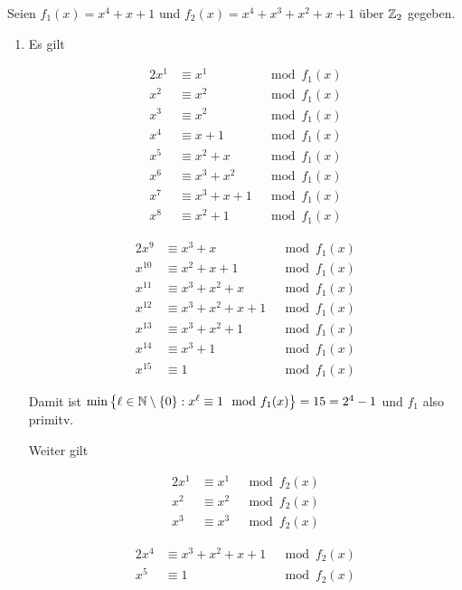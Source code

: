\documentclass[ngerman, a4paper, 11pt]{article}
\newcounter{blattcount}
\theoremstyle{plain}
\theoremstyle{plain}
\theoremstyle{proofstyle}
\begin{document}
	
	\setcounter{blattcount}{5}

\begin{exercisePage}
	Seien $f_1(x) = x^4+x+1$ und $f_2(x) = x^4+x^3+x^2+x+1$ über $\mathbb{Z}_2$ gegeben.
	
	\begin{enumerate}[label=(zu \alph*), leftmargin=*]
		\item Es gilt \\		
		\begin{minipage}{\dimexpr0.5\linewidth-\fboxrule-\fboxsep}
			\begin{alignat*}{2}
				x^1 &\equiv x^1 &\mod f_1(x)\\
				x^2 &\equiv x^2 &\mod f_1(x)\\
				x^3 &\equiv x^2 &\mod f_1(x)\\
				x^4 &\equiv x + 1 &\mod f_1(x)\\
				x^5 &\equiv x^2 + x &\mod f_1(x)\\
				x^6 &\equiv x^3 + x^2 &\mod f_1(x)\\
				x^7 &\equiv x^3 + x + 1 &\mod f_1(x)\\
				x^8 &\equiv x^2 + 1 &\mod f_1(x)
			\end{alignat*}
		\end{minipage}
		\begin{minipage}{\dimexpr0.5\linewidth-\fboxrule-\fboxsep}
			\begin{alignat*}{2}
				x^9 &\equiv x^3 + x &\mod f_1(x)\\
				x^{10} &\equiv x^2 + x + 1 &\mod f_1(x)\\
				x^{11} &\equiv x^3 + x^2 + x &\mod f_1(x)\\
				x^{12} &\equiv x^3 + x^2 + x + 1 &\mod f_1(x)\\
				x^{13} &\equiv x^3+x^2+1 &\mod f_1(x)\\
				x^{14} &\equiv x^3+1 &\mod f_1(x)\\
				x^{15} &\equiv 1 &\mod f_1(x)
			\end{alignat*}
		\end{minipage}
		
		Damit ist $\min\left\{ \ell \in \mathbb{N} \setminus \left\{ 0 \right\} : x^\ell \equiv 1 \mod f_1(x) \right\} = 15 = 2^4-1$ und $f_1$ also primitv.
		
		Weiter gilt \\
		\begin{minipage}{\dimexpr0.5\linewidth-\fboxrule-\fboxsep}
			\begin{alignat*}{2}
				x^1 &\equiv x^1 &\mod f_2(x) \\
				x^2 &\equiv x^2 &\mod f_2(x) \\
				x^3 &\equiv x^3 &\mod f_2(x) 
			\end{alignat*}
		\end{minipage}
		\begin{minipage}{\dimexpr0.5\linewidth-\fboxrule-\fboxsep}
			\begin{alignat*}{2}
				x^4 &\equiv x^3 + x^2 + x + 1 &\mod f_2(x) \\
				x^5 &\equiv 1 &\mod f_2(x) 
			\end{alignat*}
		\end{minipage}
		

\end{enumerate}
\end{exercisePage}
\end{document}
